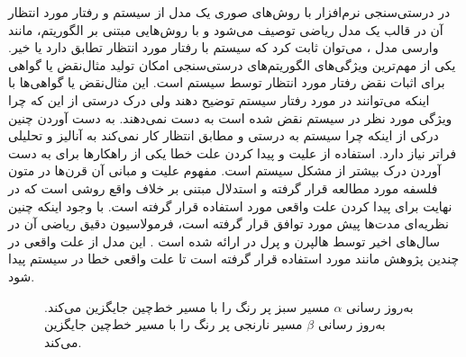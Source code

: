 در درستی‌سنجی نرم‌افزار با روش‌های صوری یک مدل از سیستم و رفتار 
مورد انتظار آن در قالب یک مدل ریاضی توصیف می‌شود و با روش‌هایی مبتنی بر الگوریتم، مانند وارسی مدل%
 \cite{clarke1997model}،
می‌توان ثابت کرد که سیستم با رفتار مورد انتظار تطابق دارد یا خیر.
یکی از مهم‌ترین ویژگی‌های الگوریتم‌های درستی‌سنجی امکان تولید مثال‌نقض‌%
یا گواهی%
برای اثبات نقض رفتار مورد انتظار توسط سیستم است.
این مثال‌نقض‌ یا گواهی‌ها با اینکه می‌توانند در مورد رفتار سیستم توضیح دهند ولی درک درستی از این که چرا ویژگی مورد نظر در سیستم نقض شده است به دست نمی‌دهند.
به دست آوردن چنین درکی از اینکه چرا سیستم به درستی و مطابق انتظار کار نمی‌کند به آنالیز و تحلیلی فراتر نیاز دارد.
استفاده از علیت%
و پیدا کردن علت خطا
یکی از راهکار‌ها برای به دست آوردن درک بیشتر از مشکل سیستم است.
مفهوم علیت و مبانی آن قرن‌ها در متون فلسفه مورد مطالعه قرار گرفته و استدلال مبتنی بر خلاف واقع%
روشی است که در نهایت برای پیدا کردن علت واقعی مورد استفاده قرار گرفته است.
با وجود اینکه چنین نظریه‌ای مدت‌ها پیش مورد توافق قرار گرفته است، فرمولاسیون دقیق ریاضی آن در سال‌های اخیر توسط هالپرن%
و پرل%
در 
\cite{hp}
ارائه شده است \cite{explications}.
این مدل از علت واقعی در چندین پژوهش مانند 
\cite{Caltais-LTL,causal-hml,causality-checking,chockler}
 مورد استفاده قرار گرفته است تا علت واقعی خطا در سیستم پیدا شود. 
\begin{figure}
    \centering
    \caption{
        به‌روز رسانی 
        $\alpha$
        مسیر سبز پر رنگ‌ را با مسیر خط‌چین جایگزین می‌کند.
        به‌روز رسانی
        $\beta$
        مسیر نارنجی پر رنگ را با مسیر خط‌چین جایگزین می‌کند.
     }
    \label{fig:intro:example}
\end{figure}
